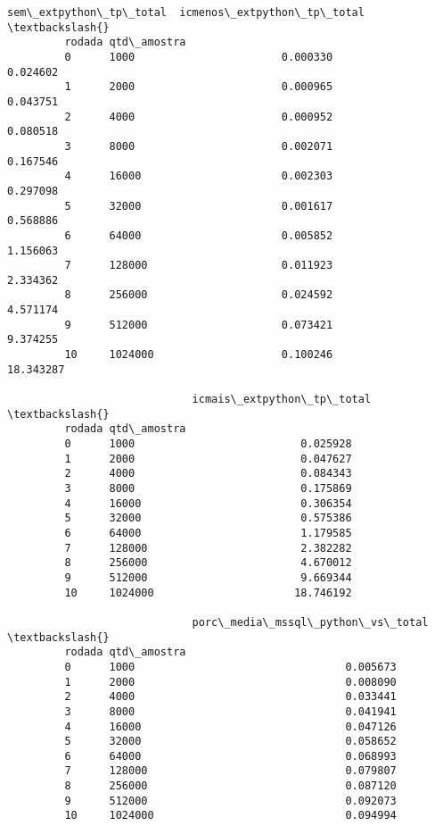 \documentclass[11pt]{article}
\begin{document}
\begin{Verbatim}[commandchars=\\\{\}]
                             sem\_extpython\_tp\_total  icmenos\_extpython\_tp\_total  \textbackslash{}
         rodada qtd\_amostra                                                       
         0      1000                       0.000330                    0.024602   
         1      2000                       0.000965                    0.043751   
         2      4000                       0.000952                    0.080518   
         3      8000                       0.002071                    0.167546   
         4      16000                      0.002303                    0.297098   
         5      32000                      0.001617                    0.568886   
         6      64000                      0.005852                    1.156063   
         7      128000                     0.011923                    2.334362   
         8      256000                     0.024592                    4.571174   
         9      512000                     0.073421                    9.374255   
         10     1024000                    0.100246                   18.343287   
         
                             icmais\_extpython\_tp\_total  \textbackslash{}
         rodada qtd\_amostra                              
         0      1000                          0.025928   
         1      2000                          0.047627   
         2      4000                          0.084343   
         3      8000                          0.175869   
         4      16000                         0.306354   
         5      32000                         0.575386   
         6      64000                         1.179585   
         7      128000                        2.382282   
         8      256000                        4.670012   
         9      512000                        9.669344   
         10     1024000                      18.746192   
         
                             porc\_media\_mssql\_python\_vs\_total  \textbackslash{}
         rodada qtd\_amostra                                     
         0      1000                                 0.005673   
         1      2000                                 0.008090   
         2      4000                                 0.033441   
         3      8000                                 0.041941   
         4      16000                                0.047126   
         5      32000                                0.058652   
         6      64000                                0.068993   
         7      128000                               0.079807   
         8      256000                               0.087120   
         9      512000                               0.092073   
         10     1024000                              0.094994   
         

\end{Verbatim}
\end{document}
